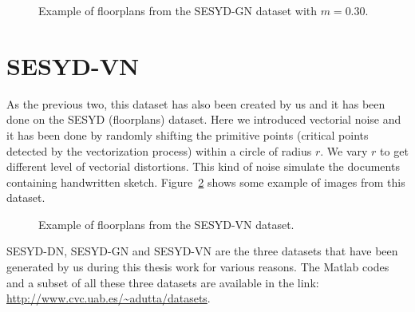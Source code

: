 \begin{figure}[h!]
\begin{center}
\subfloat[$\sigma=0.10$]{\texttt{[image: 30\_10]}}
\hspace{0.5mm}
\subfloat[$\sigma=0.40$]{\texttt{[image: 30\_40]}}
\hspace{0.5mm}
\subfloat[$\sigma=0.70$]{\texttt{[image: 30\_70]}}
\hspace{0.5mm}
\subfloat[$\sigma=1.00$]{\texttt{[image: 30\_100]}}
\end{center}
\caption{Example of floorplans from the SESYD-GN dataset with $m=0.30$.}
\label{fig:datasets:sesyd-gn}
\end{figure}

\section{SESYD-VN}
\label{sec:datasets:sesyd-vn}
As the previous two, this dataset has also been created by us and it has been done on the SESYD (floorplans) dataset. Here we introduced vectorial noise and it has been done by randomly shifting the primitive points (critical points detected by the vectorization process) within a circle of radius $r$. We vary $r$ to get different level of vectorial distortions. This kind of noise simulate the documents containing handwritten sketch. Figure~\ref{fig:datasets:sesyd-vn} shows some example of images from this dataset.
\begin{figure}[h!]
\begin{center}
\subfloat[$r=5$]{\texttt{[image: VN\_05]}}
\hspace{0.5mm}
\subfloat[$r=10$]{\texttt{[image: VN\_10]}}
\hspace{0.5mm}
\subfloat[$r=15$]{\texttt{[image: VN\_15]}}
\end{center}
\caption{Example of floorplans from the SESYD-VN dataset.}
\label{fig:datasets:sesyd-vn}
\end{figure}

SESYD-DN, SESYD-GN and SESYD-VN are the three datasets that have been generated by us during this thesis work for various reasons. The Matlab codes and a subset of all these three datasets are available in the link: \url{http://www.cvc.uab.es/~adutta/datasets}.


